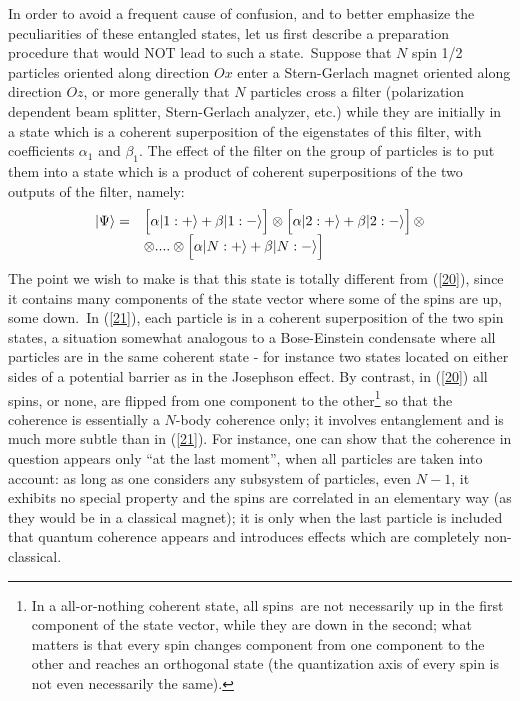 \documentclass[12pt,onecolumn]{article}%
\begin{document}
In order to avoid a frequent cause of confusion, and to better emphasize the
peculiarities of these entangled states, let us first describe a preparation
procedure that would NOT lead to such a state.\ Suppose that $N$ spin 1/2
particles oriented along direction $Ox$ enter a Stern-Gerlach magnet oriented
along direction $Oz$, or more generally that $N$ particles cross a filter
(polarization dependent beam splitter, Stern-Gerlach analyzer, etc.) while
they are initially in a state which is a coherent superposition of the
eigenstates of this filter, with coefficients $\alpha_{1}$ and $\beta_{1}$.
The effect of the filter on the group of particles is to put them into a state
which is a product of coherent superpositions of the two outputs of the
filter, namely:%
\begin{equation}%
\begin{array}
[c]{cl}%
|\Psi\rangle = & \left[  \alpha|1:+\rangle +\beta|\overset{}{1}:-\rangle \right]
\otimes\left[  \alpha|2:+\rangle +\beta|\overset{}{2}:-\rangle \right]  \otimes\\
& \otimes....\otimes\left[  \alpha| N:+\rangle +\beta|\overset{}{N}:-\rangle \right]
\end{array}
\label{21}%
\end{equation}
The point we wish to make is that this state is totally different from
(\ref{20}), since it contains many components of the state vector where some
of the spins are up, some down.\ In (\ref{21}), each particle is in a coherent
superposition of the two spin states, a situation somewhat analogous to a
Bose-Einstein condensate where all particles are in the same coherent state -
for instance two states located on either sides of a potential barrier as in
the Josephson effect. By contrast, in (\ref{20}) all spins, or none, are
flipped from one component to the other\footnote{In a all-or-nothing coherent
state, all spins\ are not necessarily up in the first component of the state
vector, while they are down in the second; what matters is that every spin
changes component from one component to the other and reaches an orthogonal
state (the quantization axis of every spin is not even necessarily the same).}
so that the coherence is essentially a $N$-body coherence only; it involves
entanglement and is much more subtle than in (\ref{21}). For instance, one can
show \cite{FL2} that the coherence in question appears only ``at the last
moment'', when all particles are taken into account: as long as one considers
any subsystem of particles, even $N-1$, it exhibits no special property and
the spins are correlated in an elementary way (as they would be in a classical
magnet); it is only when the last particle is included that quantum coherence
appears and introduces effects which are completely non-classical.
\end{document}
